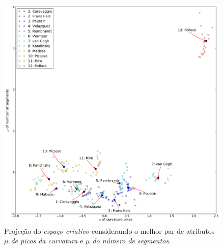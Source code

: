 \begin{figure}[h!]
\begin{center}
        \includegraphics[scale=.5]{figs/caso1_g1}
      \caption{Projeção do \textit{espaço criativo} considerando o melhor par de
        atributos \emph{$\mu$ de picos da curvatura} e \emph{$\mu$ do número de segmentos}.}
        \label{fig:caso1_g1}
\end{center}
\end{figure}

